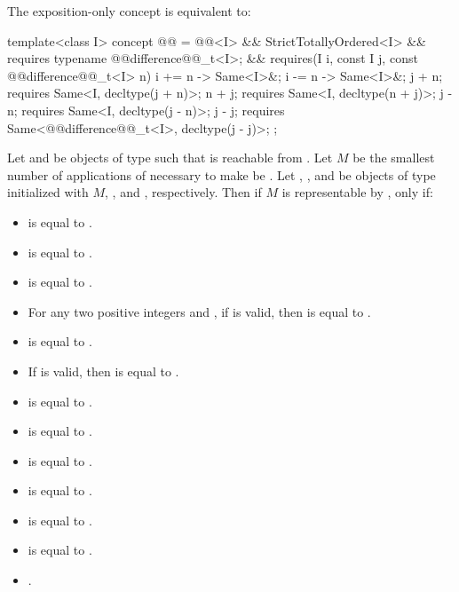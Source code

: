 {\pnum
The exposition-only  concept is equivalent to:
\begin{itemdecl}
template<class I>
concept @@ =
  @@<I> && StrictTotallyOrdered<I> &&
  requires { typename @@difference@@_t<I>; } &&
  requires(I i, const I j, const @@difference@@_t<I> n) {
    { i += n } -> Same<I>&;
    { i -= n } -> Same<I>&;
    j + n; requires Same<I, decltype(j + n)>;
    n + j; requires Same<I, decltype(n + j)>;
    j - n; requires Same<I, decltype(j - n)>;
    j - j; requires Same<@@difference@@_t<I>, decltype(j - j)>;
  };
\end{itemdecl}

Let  and  be objects of type  such that  is
reachable from . Let $M$ be the smallest number of applications
of  necessary to make  be . Let
, , and  be objects of type
initialized with $M$, , and , respectively. Then if
$M$ is representable by ,
 only if:
\begin{itemize}
\item {} is equal to .
\item {} is equal to .
\item {} is equal to .
\item For any two positive integers  and , if
 is valid, then  is equal to
.
\item {} is equal to .
\item If  is valid, then  is equal to
.
\item {} is equal to .
\item {} is equal to .
\item {} is equal to .
\item {} is equal to .
\item {} is equal to .
\item {} is equal to .
\item {}.
\end{itemize}

}
